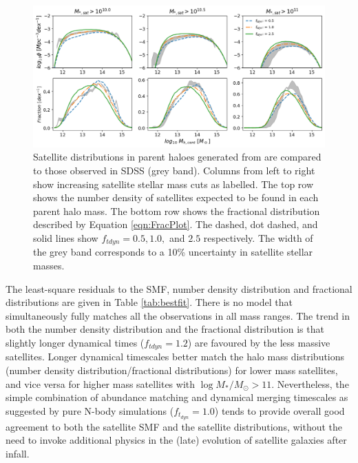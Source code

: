 \begin{figure}[h]
	\centering
	\includegraphics[width = \linewidth]{Figures/Chapter3/Tdyn_Sat_Dist.png}
	\caption{Satellite distributions in parent haloes generated from \steel are compared to those observed in SDSS (grey band). Columns from left to right show increasing satellite stellar mass cuts as labelled. The top row shows the number density of satellites expected to be found in each parent halo mass. The bottom row shows the fractional distribution described by Equation \ref{eqn:FracPlot}. The dashed, dot dashed, and solid lines show $f_{tdyn} = 0.5, 1.0,$ and $2.5$ respectively. The width of the grey band corresponds to a 10\% uncertainty in satellite stellar masses.}
	\label{fig:Sat_Dist_Tdyn}
\end{figure}

The least-square residuals to the SMF, number density distribution and fractional distributions are given in Table \ref{tab:bestfit}. There is no model that simultaneously fully matches all the observations in all mass ranges. The trend in both the number density distribution and the fractional distribution is that slightly longer dynamical times ($f_{tdyn}  = 1.2$) are favoured by the less massive satellites. Longer dynamical timescales better match the halo mass distributions (number density distribution/fractional distributions) for lower mass satellites, and vice versa for higher mass satellites with $\log M_{*}/M_{\odot} >11$. Nevertheless, the simple combination of abundance matching and dynamical merging timescales as suggested by pure N-body simulations ($f_{t_{dyn}} = 1.0$) tends to provide overall good agreement to both the satellite SMF and the satellite distributions, without the need to invoke additional physics in the (late) evolution of satellite galaxies after infall.

